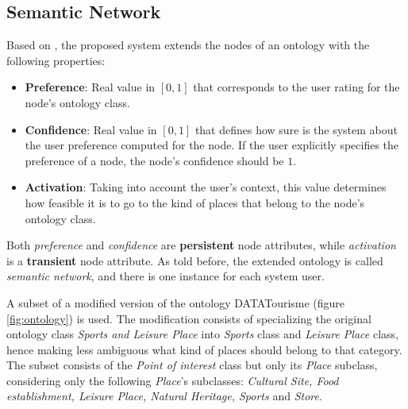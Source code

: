 \subsection{Semantic Network} \label{section:semantic_network}

Based on \cite{bahramian_abbaspour_claramunt_2017}, the proposed system extends the nodes of an ontology with the following properties:
\begin{itemize}
    \item \textbf{Preference}: Real value in $[0, 1]$ that corresponds to the user rating for the node's ontology class.
    \item \textbf{Confidence}: Real value in $[0, 1]$ that defines how sure is the system about the user preference computed for the node. If the user explicitly specifies the preference of a node, the node's confidence should be $1$.
    \item \textbf{Activation}: Taking into account the user's context, this value determines how feasible it is to go to the kind of places that belong to the node's ontology class.
\end{itemize}{}
Both \textit{preference} and \textit{confidence} are \textbf{persistent} node attributes, while \textit{activation} is a \textbf{transient} node attribute. As told before, the extended ontology is called \textit{semantic network}, and there is one instance for each system user.

A subset of a modified version of the ontology DATATourisme (figure \ref{fig:ontology}) is used. The modification consists of specializing the original ontology class \textit{Sports and Leisure Place} into \textit{Sports} class and \textit{Leisure Place} class, hence making less ambiguous what kind of places should belong to that category. The subset consists of the \textit{Point of interest} class but only its \textit{Place} subclass, considering only the following \textit{Place}'s subclasses: \textit{Cultural Site, Food establishment, Leisure Place, Natural Heritage, Sports} and \textit{Store}. 

